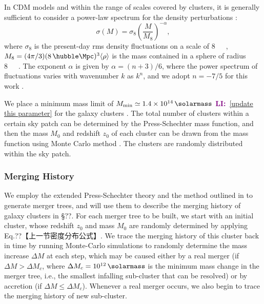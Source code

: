 \documentclass[modern]{aastex61}
\newcommand{\R}[1]{\mathrm{#1}}
\newcommand{\LI}[1]{\textcolor{purple}{\textbf{LI:}}~\uline{#1}}
\begin{document}
In CDM models and within the range of scales covered by clusters,
it is generally sufficient to consider a power-law spectrum
for the density perturbations \citep{sarazin2002,randall2002}:
\begin{equation}
  \label{eq:sigma-mass}
  \sigma(M) = \sigma_8 \left( \frac{M}{M_8} \right)^{-\alpha},
\end{equation}
where $\sigma_8$ is the present-day rms density fluctuations on a
scale of \SI{8}{\per\hubble\Mpc},
$M_8 = (4\pi/3)(8 \,\si{\per\hubble\Mpc})^3 \langle{\rho}\rangle$
is the mass contained in a sphere of radius \SI{8}{\per\hubble\Mpc}.
The exponent $\alpha$ is given by $\alpha = (n+3)/6$, where
the power spectrum of fluctuations varies with wavenumber $k$
as $k^n$, and we adopt $n = -7/5$ for this work \citep{randall2002}.

We place a minimum mass limit of $M_{\R{min}} \simeq \SI{1.4e14}{\solarmass}$
\LI{[update this parameter]} for the galaxy clusters \citep{zandanel2014}.
The total number of clusters within a certain sky patch can be
determined by the Press-Schechter mass function, and then the mass
$M_0$ and redshift $z_0$ of each cluster can be drawn from the mass
function using Monte Carlo method \citep{wang2010}.
The clusters are randomly distributed within the sky patch.


\subsubsection{Merging History}
\label{sec:merging-history}

We employ the extended Press-Schechter theory and the method outlined in
\citet{lacey1993} to generate merger trees,
and will use them to describe the merging history of galaxy clusters in
\S??. For each merger tree to be built,
we start with an initial cluster, whose redshift $z_{0}$ and mass $M_{0}$
are randomly determined by applying Eq.??【上一节密度分布公式】.
We trace the merging history of this cluster back in time by running
Monte-Carlo simulations to randomly determine the mass increase
$\Delta M$ at each step, which may be caused either by a real merger (if
$\Delta M > \Delta M_c$, where $\Delta M_c = \SI{e12}{\solarmass}$
is the minimum mass change in the merger tree, i.e., the smallest infalling
sub-cluster that can be resolved)
or by accretion  (if $\Delta M \leq \Delta M_c$). Whenever a real merger
occurs, we also begin to trace the merging history
of new sub-cluster.
\end{document}
